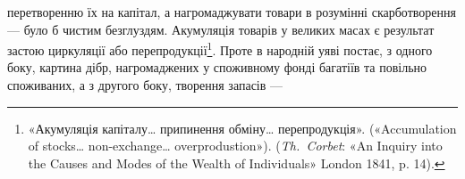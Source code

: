 перетворенню їх на капітал, а нагромаджувати товари
в розумінні скарботворення — було б чистим безглуздям.
Акумуляція товарів у великих масах є результат застою циркуляції
або перепродукції\footnote{
«Акумуляція капіталу\dots{} припинення обміну\dots{} перепродукція».
(«Accumulation of stocks\dots{} non-exchange\dots{} overprodustion»).
(\emph{Th.~Corbet}: «An Inquiry into the Causes and Modes of the Wealth of
Individuals» London 1841, p. 14).
}. Проте в народній уяві постає, з одного
боку, картина дібр, нагромаджених у споживному фонді багатіїв
та повільно споживаних, а з другого боку, творення запасів —
\parbreak{}  %
